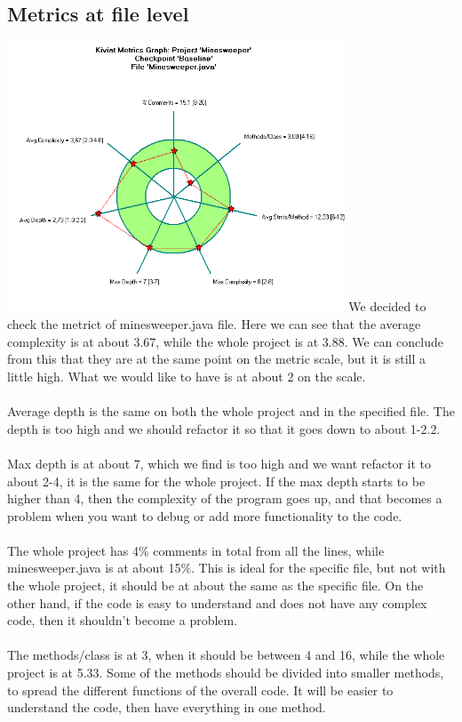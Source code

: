 \documentclass[UKenglish]{article}  %
\begin{document}
\subsection{Metrics at file level}
\includegraphics[height=8cm]{kiviat_diagram_minesweeper}
We decided to check the metrict of minesweeper.java file. Here we can see that the average complexity is at about 3.67, while the whole project is at 3.88. We can conclude from this that they are at the same point on the metric scale, but it is still a little high. What we would like to have is at about 2 on the scale. \\\\
Average depth is the same on both the whole project and in the specified file. The depth is too high and we should refactor it so that it goes down to about 1-2.2. \\\\
Max depth is at about 7, which we find is too high and we want refactor it to about 2-4, it is the same for the whole project. If the max depth starts to be higher than 4, then the complexity of the program goes up, and that becomes a problem when you want to debug or add more functionality to the code. \\\\
The whole project has 4\% comments in total from all the lines, while minesweeper.java is at about 15\%. This is ideal for the specific file, but not with the whole project, it should be at about the same as the specific file. On the other hand, if the code is easy to understand and does not have any complex code, then it shouldn't become a problem. \\\\
The methods/class is at 3, when it should be between 4 and 16, while the whole project is at 5.33. Some of the methods should be divided into smaller methods, to spread the different functions of the overall code. It will be easier to understand the code, then have everything in one method.\\\\
\end{document}
